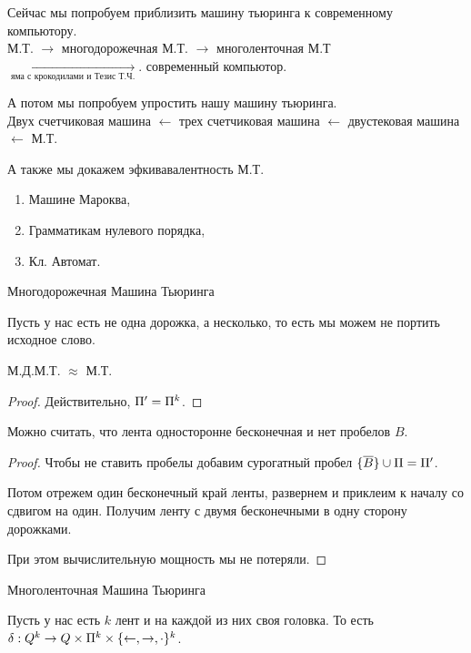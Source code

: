 Сейчас мы попробуем приблизить машину тьюринга к современному компьютору.\\
М.Т. $\to$ многодорожечная  М.Т. $\to$ многоленточная М.Т $\underset{\text{яма с крокодилами и Тезис Т.Ч.}}{\longrightarrow}$. современный компьютор.

А потом мы попробуем упростить нашу машину тьюринга.\\
Двух счетчиковая машина $\leftarrow$ трех счетчиковая машина $\leftarrow$ двустековая машина $\leftarrow$ М.Т.

А также мы докажем эфкивавалентность М.Т.\begin{enumerate}
    \item Машине Мароква,
    \item Грамматикам нулевого порядка,
    \item Кл. Автомат.
\end{enumerate}

\begin{definition}
    Многодорожечная Машина Тьюринга

    Пусть у нас есть не одна дорожка, а несколько, то есть мы можем не портить исходное слово.
\end{definition}

\begin{statement}
    М.Д.М.Т. $\approx$ М.Т.

\end{statement}

\begin{proof}
    Действительно, $\Pi^{\prime} = \Pi^k$.
\end{proof}

\begin{statement}
    Можно считать, что лента односторонне бесконечная и нет пробелов $B$.
\end{statement}
\begin{proof}
    Чтобы не ставить пробелы добавим сурогатный пробел $\{ \overline{B}\} \cup \Pi = \Pi^{\prime}$.

    Потом отрежем один бесконечный край ленты, развернем и приклеим к началу со сдвигом на один. Получим ленту с двумя бесконечными в одну сторону дорожками.

    При этом вычислительную мощность мы не потеряли.

\end{proof}
\begin{definition}
    Многоленточная Машина Тьюринга

    Пусть у нас есть $k$ лент и на каждой из них своя головка. То есть
    $\delta: Q\time \Pi^k \to Q \times \Pi^k \times \{\leftarrow, \rightarrow, \cdot\}^k$.
\end{definition}



